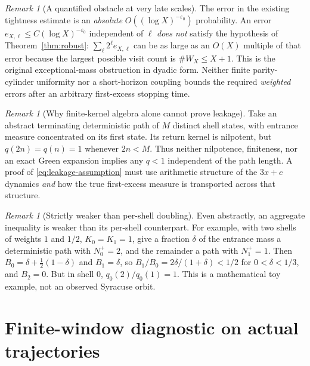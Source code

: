 \documentclass[11pt,a4paper]{article}
\theoremstyle{remark}
\newtheorem{remark}[theorem]{Remark}
\begin{document}
\begin{remark}[A quantified obstacle at very late scales]
The error in the existing tightness estimate is an \emph{absolute}
$O((\log X)^{-\varepsilon_0})$ probability.  An error
$e_{X,\ell}\le C(\log X)^{-\varepsilon_0}$ independent of $\ell$
\emph{does not} satisfy the hypothesis of
Theorem~\ref{thm:robust}:
$\sum_\ell2^\ell e_{X,\ell}$ can be as large as an
$O(X)$ multiple of that error because the largest possible visit
count is $\#W_X\le X+1$.  This is the original exceptional-mass
obstruction in dyadic form.  Neither finite parity-cylinder
uniformity nor a short-horizon coupling bounds the required
\emph{weighted} errors after an arbitrary first-excess stopping time.
\end{remark}
\begin{remark}[Why finite-kernel algebra alone cannot prove leakage]
Take an abstract terminating deterministic path of $M$ distinct shell
states, with entrance measure concentrated on its first state.
Its return kernel is nilpotent, but
$q(2n)=q(n)=1$ whenever $2n<M$.
Thus neither nilpotence, finiteness, nor an exact Green expansion
implies any $q<1$ independent of the path length.  A proof of
\eqref{eq:leakage-assumption} must use arithmetic structure of the
$3x+c$ dynamics \emph{and} how the true first-excess measure is
transported across that structure.
\end{remark}
\begin{remark}[Strictly weaker than per-shell doubling]
Even abstractly, an aggregate inequality is weaker than its
per-shell counterpart.  For example, with two shells of weights
$1$ and $1/2$, $K_0=K_1=1$, give a fraction $\delta$ of the
entrance mass a deterministic path with $N_0^+=2$, and the remainder
a path with $N_1^+=1$.  Then
$B_0=\delta+\frac12(1-\delta)$ and $B_1=\delta$, so
$B_1/B_0=2\delta/(1+\delta)<1/2$ for $0<\delta<1/3$,
and $B_2=0$.  But in shell $0$, $q_0(2)/q_0(1)=1$.
This is a mathematical toy example, not an observed Syracuse orbit.
\end{remark}

\section{Finite-window diagnostic on actual trajectories}
\end{document}

